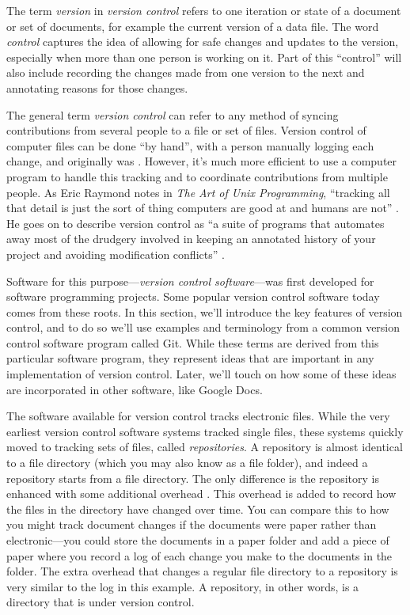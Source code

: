\documentclass[]{tufte-book}
\begin{document}
The term \emph{version} in \emph{version control} refers to one iteration or state of a
document or set of documents, for example the current version of a data file.
The word \emph{control} captures the idea of allowing for safe changes and updates to
the version, especially when more than one person is working on it. Part of this
``control'' will also include recording the changes made from one version to the
next and annotating reasons for those changes.

The general term \emph{version control} can refer to any method of syncing
contributions from several people to a file or set of files. Version control of
computer files can be done ``by hand'', with a person manually logging each change,
and originally was \citep{irving2011astonishments}. However, it's much more efficient
to use a computer program to handle this tracking and to coordinate
contributions from multiple people. As Eric Raymond notes in \emph{The Art of Unix
Programming}, ``tracking all that detail is just the sort of thing computers are
good at and humans are not'' \citep{raymond2003art}. He goes on to describe version
control as ``a suite of programs that automates away most of the drudgery
involved in keeping an annotated history of your project and avoiding
modification conflicts'' \citep{raymond2003art}.

Software for this purpose---\emph{version control software}---was first developed for
software programming projects. Some popular version control software today
comes from these roots. In this section, we'll introduce the key features of
version control, and to do so we'll use examples and terminology from a common
version control software program called Git. While these terms are derived
from this particular software program, they represent ideas that are important
in any implementation of version control. Later, we'll touch on how some of these
ideas are incorporated in other software, like Google Docs.

The software available for version control tracks electronic files. While the
very earliest version control software systems tracked single files, these
systems quickly moved to tracking sets of files, called \emph{repositories}. A
repository is almost identical to a file directory (which you may also know as a
file folder), and indeed a repository starts from a file directory. The only
difference is the repository is enhanced with some additional overhead
\citep{klemens201421st}. This overhead is added to record how the files in the
directory have changed over time. You can compare this to how you might track
document changes if the documents were paper rather than electronic---you could
store the documents in a paper folder and add a piece of paper where you record
a log of each change you make to the documents in the folder. The extra overhead
that changes a regular file directory to a repository is very similar to the log
in this example. A repository, in other words, is a directory that is under
version control.
\end{document}
